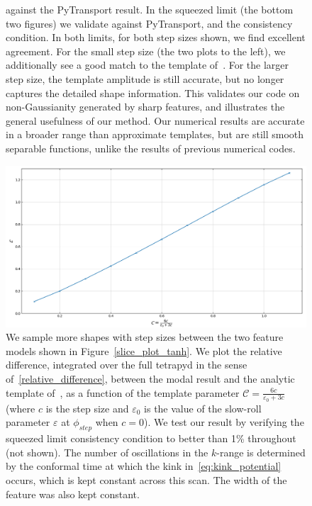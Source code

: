\begin{figure}
{	against the PyTransport result. In the squeezed limit (the bottom two figures)
	we validate against PyTransport, and the consistency condition.
	In both limits, for both step sizes shown, we find excellent agreement.
	For the small step size (the two plots to the left), we additionally
	see a good match to the template of~\cite{adshead}. For the larger step size,
	the template amplitude is still accurate,
    but no longer captures the detailed shape information.
    This validates our code on non-Gaussianity generated by sharp
    features, and illustrates the general usefulness of our method.
	Our numerical results are accurate in a broader range than
	approximate templates, but are still smooth separable functions,
	unlike the results of previous numerical codes.
}\label{fig:tanh_sqz}
\end{figure}
\begin{figure}[!pth]
\centering
\includegraphics[width=.75\columnwidth]{plots/tanh_scan_C_cropped.png}
\caption{
    We sample more shapes with step sizes between the two
    feature models shown in Figure~\ref{slice_plot_tanh}.
    We plot the relative difference,
    integrated over the full tetrapyd
    in the sense of~\eqref{relative_difference},
    between the modal result and the analytic template of~\cite{adshead},
    as a function of the template parameter $\mathcal{C}=\frac{6c}{\varepsilon_0+3c}$
    (where $c$ is the step size and $\varepsilon_0$ is the value of the slow-roll parameter
    $\varepsilon$ at $\phi_{step}$ when $c=0$). We test our result by verifying
    the squeezed limit consistency
    condition to better than 1\% throughout (not shown). The number of oscillations in the
    $k$-range is determined by the conformal time at which the kink in~\eqref{eq:kink_potential}
    occurs, which is kept constant across this scan. The width of the feature was also kept constant.
}\label{fig:tanh_scan}
\end{figure}


